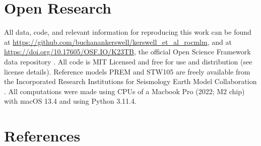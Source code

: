 \documentclass[draft,linenumbers]{agujournal2018}
\begin{document}
\section{Open Research}\label{open-research}

All data, code, and relevant information for reproducing this work can be found at \url{https://github.com/buchanankerswell/kerswell_et_al_rocmlm}, and at \url{https://doi.org/10.17605/OSF.IO/K23TB}, the official Open Science Framework data repository \citep{kerswell2024}. All code is MIT Licensed and free for use and distribution (see license details). Reference models PREM and STW105 are freely available from the Incorporated Research Institutions for Seismology Earth Model Collaboration \citep[IRIS EMC, doi: 10.17611/DP/EMC.1,][]{trabant2012}. All computations were made using CPUs of a Macbook Pro (2022; M2 chip) with macOS 13.4 and using Python 3.11.4.

\section{References}\label{references}

\cleardoublepage


\end{document}
